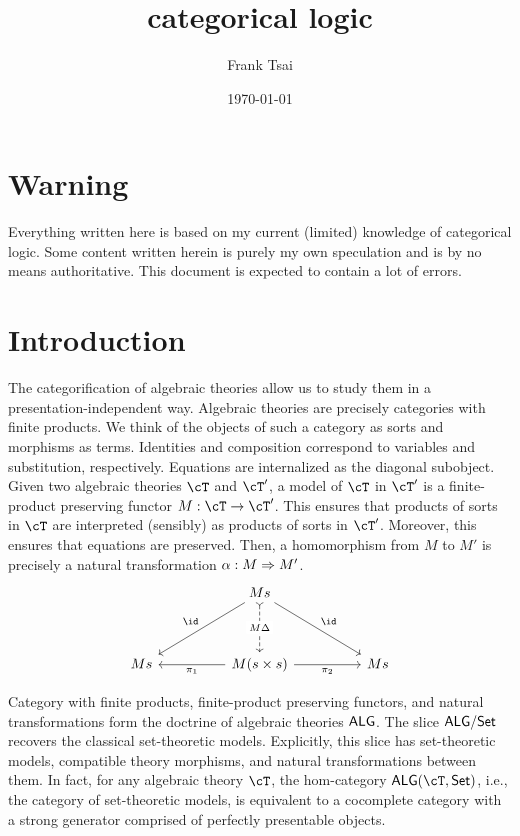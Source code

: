 \documentclass[article,10pt,oneside]{memoir}
\title{categorical logic}
\author{Frank Tsai}
\date{\today}
\begin{document}
\maketitle
\tableofcontents

\section{Warning}
\label{sec:warning}

Everything written here is based on my current (limited) knowledge of categorical logic.
Some content written herein is purely my own speculation and is by no means authoritative.
This document is expected to contain a lot of errors.

\section{Introduction}
\label{sec:introduction}

The categorification of algebraic theories allow us to study them in a presentation-independent way.
Algebraic theories are precisely categories with finite products.
We think of the objects of such a category as sorts and morphisms as terms.
Identities and composition correspond to variables and substitution, respectively.
Equations are internalized as the diagonal subobject.
Given two algebraic theories $\cT$ and $\cT'$, a model of $\cT$ in $\cT'$ is a finite-product preserving functor $M : \cT \to \cT'$.
This ensures that products of sorts in $\cT$ are interpreted (sensibly) as products of sorts in $\cT'$.
Moreover, this ensures that equations are preserved.
Then, a homomorphism from $M$ to $M'$ is precisely a natural transformation $\alpha : M \Rightarrow M'$.
\[\begin{tikzcd}
    && Ms \\
    \\
    Ms && {M(s \times s)} && {Ms}
    \arrow["{\pi_{1}}", from=3-3, to=3-1]
    \arrow["{\pi_{2}}"', from=3-3, to=3-5]
    \arrow["\id"', from=1-3, to=3-1]
    \arrow["\id", from=1-3, to=3-5]
    \arrow["M\Delta"{description}, dashed, tail, from=1-3, to=3-3]
  \end{tikzcd}\]

Category with finite products, finite-product preserving functors, and natural transformations form the doctrine of algebraic theories $\mathsf{ALG}$.
The slice $\mathsf{ALG}/\mathsf{Set}$ recovers the classical set-theoretic models.
Explicitly, this slice has set-theoretic models, compatible theory morphisms, and natural transformations between them.
In fact, for any algebraic theory $\cT$, the hom-category $\CAlg(\cT,\CSet)$, i.e., the category of set-theoretic models, is equivalent to a cocomplete category with a strong generator comprised of perfectly presentable objects.
\end{document}
